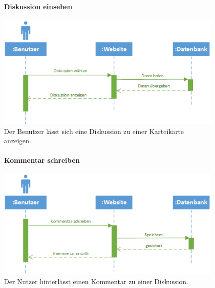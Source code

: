 \documentclass[12pt,a4paper]{article}
\begin{document}
\begin{figure}[H]
	\centering
	\paragraph{Diskussion einsehen}
	\includegraphics[width=\textwidth]{Bilder/Sequenzdiagramme/DiskussionEinsehen.png}
	\caption{Der Benutzer lässt sich eine Diskussion zu einer Karteikarte anzeigen.}
	\label{SzDiskussionEinsehen}
\end{figure}
\begin{figure}[H]
	\centering
	\paragraph{Kommentar schreiben}
	\includegraphics[width=\textwidth]{Bilder/Sequenzdiagramme/KommentarSchreiben.png}
	\caption{Der Nutzer hinterlässt einen Kommentar zu einer Diskussion.}
	\label{SzKommentarSchreiben}
\end{figure}
\end{document}
